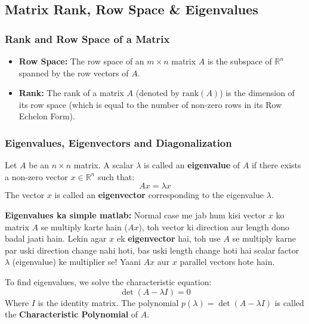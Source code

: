 \documentclass[11pt,a4paper]{article}
\begin{document}
\subsection{Matrix Rank, Row Space \& Eigenvalues}

\subsubsection{Rank and Row Space of a Matrix}
\begin{definitionbox}
\begin{itemize}
    \item \textbf{Row Space:} The row space of an $m \times n$ matrix $A$ is the subspace of $\mathbb{R}^n$ spanned by the row vectors of $A$.
    \item \textbf{Rank:} The rank of a matrix $A$ (denoted by $\text{rank}(A)$) is the dimension of its row space (which is equal to the number of non-zero rows in its Row Echelon Form).
\end{itemize}
\end{definitionbox}

\subsubsection{Eigenvalues, Eigenvectors and Diagonalization}
\begin{definitionbox}
Let $A$ be an $n \times n$ matrix. A scalar $\lambda$ is called an \textbf{eigenvalue} of $A$ if there exists a non-zero vector $x \in \mathbb{R}^n$ such that:
\[ A x = \lambda x \]
The vector $x$ is called an \textbf{eigenvector} corresponding to the eigenvalue $\lambda$.
\end{definitionbox}

\begin{hinglishbox}
\textbf{Eigenvalues ka simple matlab:}
Normal case me jab hum kisi vector $x$ ko matrix $A$ se multiply karte hain ($Ax$), toh vector ki direction aur length dono badal jaati hain.
Lekin agar $x$ ek \textbf{eigenvector} hai, toh use $A$ se multiply karne par uski direction change nahi hoti, bas uski length change hoti hai scalar factor $\lambda$ (eigenvalue) ke multiplier se! Yaani $Ax$ aur $x$ parallel vectors hote hain.
\end{hinglishbox}

\begin{theorembox}
To find eigenvalues, we solve the characteristic equation:
\[ \det(A - \lambda I) = 0 \]
Where $I$ is the identity matrix. The polynomial $p(\lambda) = \det(A - \lambda I)$ is called the \textbf{Characteristic Polynomial} of $A$.
\end{theorembox}
\end{document}
